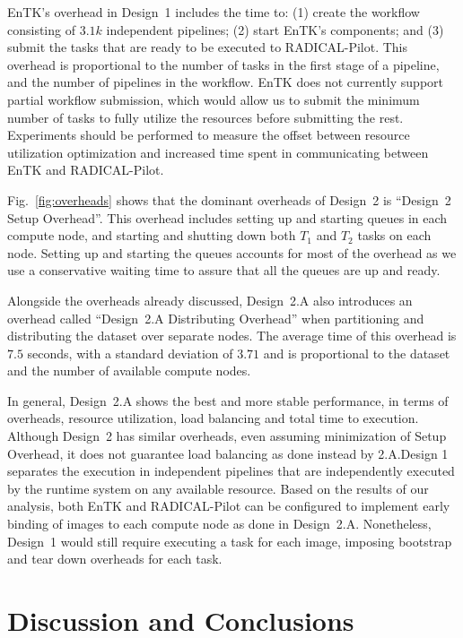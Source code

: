 EnTK's overhead in Design~1 includes the time to: (1) create the workflow
consisting of $3.1k$ independent pipelines; (2) start EnTK's components; and
(3) submit the tasks that are ready to be executed to RADICAL-Pilot. This
overhead is proportional to the number of tasks in the first stage of a
pipeline, and the number of pipelines in the workflow. EnTK does not currently
support partial workflow submission, which would allow us to submit the
minimum number of tasks to fully utilize the resources before submitting the
rest. Experiments should be performed to measure the offset between resource
utilization optimization and increased time spent in communicating between
EnTK and RADICAL-Pilot.

Fig.~\ref{fig:overheads} shows that the dominant overheads of Design~2 is
``Design~2 Setup Overhead''. This overhead includes setting up and starting
queues in each compute node, and starting and shutting down both $T_{1}$ and
$T_{2}$ tasks on each node. Setting up and starting the queues accounts for
most of the overhead as we use a conservative waiting time to assure that all
the queues are up and ready.

Alongside the overheads already discussed, Design~2.A also introduces an
overhead called ``Design~2.A Distributing Overhead'' when partitioning and
distributing the dataset over separate nodes. The average time of this
overhead is $7.5$ seconds, with a standard deviation of $3.71$ and is
proportional to the dataset and the number of available compute nodes.

In general, Design~2.A shows the best and more stable performance, in terms of
overheads, resource utilization, load balancing and total time to execution.
Although Design~2 has similar overheads, even assuming minimization of Setup
Overhead, it does not guarantee load balancing as done instead by 2.A.Design 1
separates the execution in independent pipelines that are independently
executed by the runtime system on any available resource. Based on the results
of our analysis, both EnTK and RADICAL-Pilot can be configured to implement
early binding of images to each compute node as done in Design~2.A.
Nonetheless, Design~1 would still require executing a task for each image,
imposing bootstrap and tear down overheads for each task.

\section{Discussion and Conclusions}
\label{sec:des_concl}

